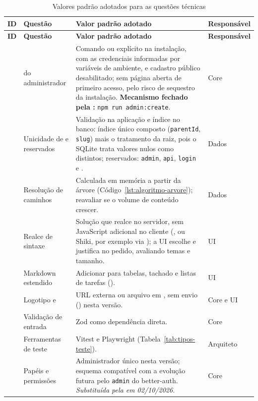 \begingroup
\begin{longtable}{@{}L{1.1cm}L{3.2cm}L{8.4cm}L{1.7cm}@{}}
\caption{Valores padrão adotados para as questões técnicas}\label{tab:adr017}\\
\toprule
\textbf{ID} & \textbf{Questão} & \textbf{Valor padrão adotado} & \textbf{Responsável}\\
\midrule
\endfirsthead
\toprule
\textbf{ID} & \textbf{Questão} & \textbf{Valor padrão adotado} & \textbf{Responsável}\\
\midrule
\endhead
\bottomrule
\endfoot
{} &  do administrador & Comando ou  explícito na instalação, com as credenciais informadas por variáveis de ambiente, e cadastro público desabilitado; sem página aberta de primeiro acesso, pelo risco de sequestro da instalação. \textbf{Mecanismo fechado pela :} \texttt{npm run admin:create}. & Core\\[1pt]
 & Unicidade de  e  reservados & Validação na aplicação e índice no banco: índice único composto (\texttt{parentId}, \texttt{slug}) mais o tratamento da raiz, pois o SQLite trata valores nulos como distintos; reservados: \texttt{admin}, \texttt{api}, \texttt{login} e . & Dados\\[1pt]
 & Resolução de caminhos & Calculada em memória a partir da árvore (Código~\ref{lst:algoritmo-arvore}); reavaliar se o volume de conteúdo crescer. & Dados\\[1pt]
 & Realce de sintaxe & Solução que realce no servidor, sem JavaScript adicional no cliente (,  ou Shiki, por exemplo via ); a UI escolhe e justifica no pedido, avaliando temas e tamanho. & UI\\[1pt]
 & Markdown estendido & Adicionar  para tabelas, tachado e listas de tarefas (). & UI\\[1pt]
 & Logotipo e  & URL externa ou arquivo em , sem envio () nesta versão. & Core e UI\\[1pt]
 & Validação de entrada & Zod como dependência direta. & Core\\[1pt]
 & Ferramentas de teste & Vitest e Playwright (Tabela~\ref{tab:tipos-teste}). & Arquiteto\\[1pt]
 & Papéis e permissões & Administrador único nesta versão; esquema compatível com a evolução futura pelo  \texttt{admin} do better-auth. \emph{Substituída pela  em 02/10/2026.} & Core\\[1pt]

\end{longtable}
